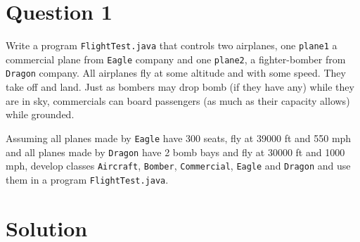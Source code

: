 %
%
%
%

\section*{Question 1}

Write a program \texttt{FlightTest.java} that controls two airplanes, one \texttt{plane1} a commercial plane from \texttt{Eagle} company and one \texttt{plane2}, a fighter-bomber from \texttt{Dragon} company.  All airplanes fly at some altitude and with some speed. They take off and land. Just as bombers may drop bomb (if they have any) while they are in sky, commercials can board passengers (as much as their capacity allows) while grounded.

Assuming all planes made by \texttt{Eagle} have 300 seats, fly at 39000 ft and 550 mph and all planes made by \texttt{Dragon} have 2 bomb bays and fly at 30000 ft and 1000 mph, develop classes \texttt{Aircraft}, \texttt{Bomber}, \texttt{Commercial}, \texttt{Eagle} and \texttt{Dragon} and use them in a program \texttt{FlightTest.java}.

\section*{Solution}

